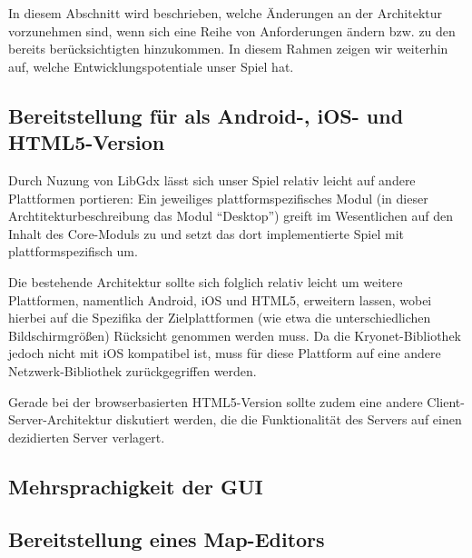 \documentclass[enabledeprecatedfontcommands,fontsize=12pt,paper=a4,twoside,parskip=half]{scrartcl}
\begin{document}

In diesem Abschnitt wird beschrieben, welche Änderungen an der Architektur vorzunehmen sind, wenn sich eine Reihe von Anforderungen ändern bzw. zu den bereits berücksichtigten hinzukommen. In diesem Rahmen zeigen wir weiterhin auf, welche Entwicklungspotentiale unser Spiel hat.

\subsection{Bereitstellung für als Android-, iOS- und HTML5-Version}

Durch Nuzung von LibGdx lässt sich unser Spiel relativ leicht auf andere Plattformen portieren: Ein jeweiliges plattformspezifisches Modul (in dieser Archtitekturbeschreibung das Modul \enquote{Desktop}) greift im Wesentlichen auf den Inhalt des Core-Moduls zu und setzt das dort implementierte Spiel mit plattformspezifisch um.

Die bestehende Architektur sollte sich folglich relativ leicht um weitere Plattformen, namentlich Android, iOS und HTML5, erweitern lassen, wobei hierbei auf die Spezifika der Zielplattformen (wie etwa die unterschiedlichen Bildschirmgrößen) Rücksicht genommen werden muss. Da die Kryonet-Bibliothek jedoch nicht mit iOS kompatibel ist, muss für diese Plattform auf eine andere Netzwerk-Bibliothek zurückgegriffen werden. 

Gerade bei der browserbasierten HTML5-Version sollte zudem eine andere Client-Server-Architektur diskutiert werden, die die Funktionalität des Servers auf einen dezidierten Server verlagert. 

\subsection{Mehrsprachigkeit der GUI}

\subsection{Bereitstellung eines Map-Editors}

\end{document}
